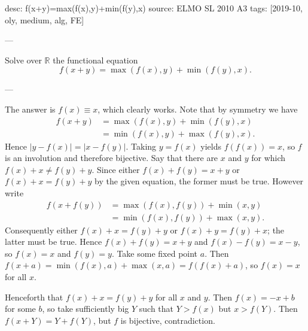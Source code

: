 desc: f(x+y)=max(f(x),y)+min(f(y),x)
source: ELMO SL 2010 A3
tags: [2019-10, oly, medium, alg, FE]

---

Solve over $\mathbb R$ the functional equation \[f(x+y)=\max(f(x),y)+\min(f(y),x).\]

---

The answer is $f(x)\equiv x$, which clearly works. Note that by symmetry we have
\begin{align*}
    f(x+y)&=\max(f(x),y)+\min(f(y),x)\\
    &=\min(f(x),y)+\max(f(y),x).
\end{align*}
Hence $|y-f(x)|=|x-f(y)|$. Taking $y=f(x)$ yields $f(f(x))=x$, so $f$ is an involution and therefore bijective. Say that there are $x$ and $y$ for which $f(x)+x\ne f(y)+y$. Since either $f(x)+f(y)=x+y$ or $f(x)+x=f(y)+y$ by the given equation, the former must be true. However write
\begin{align*}
    f(x+f(y))&=\max(f(x),f(y))+\min(x,y)\\
    &=\min(f(x),f(y))+\max(x,y).
\end{align*}
Consequently either $f(x)+x=f(y)+y$ or $f(x)+y=f(y)+x$; the latter must be true. Hence $f(x)+f(y)=x+y$ and $f(x)-f(y)=x-y$, so $f(x)=x$ and $f(y)=y$. Take some fixed point $a$. Then $f(x+a)=\min(f(x),a)+\max(x,a)=f(f(x)+a)$, so $f(x)=x$ for all $x$.

Henceforth that $f(x)+x=f(y)+y$ for all $x$ and $y$. Then $f(x)=-x+b$ for some $b$, so take sufficiently big $Y$ such that $Y>f(x)$ but $x>f(Y)$. Then $f(x+Y)=Y+f(Y)$, but $f$ is bijective, contradiction.
